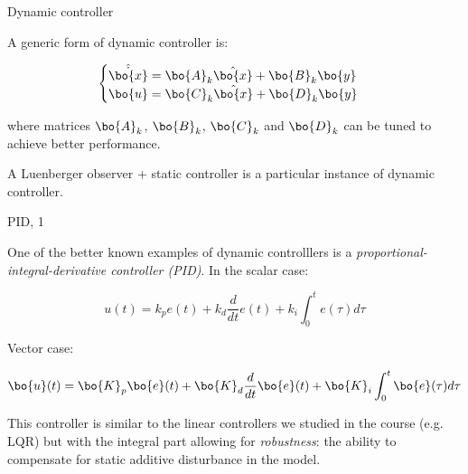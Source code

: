 \documentclass{beamer}
\begin{document}
\begin{frame}{Dynamic controller}
	\begin{flushleft}
		
		A generic form of dynamic controller is:
		
		\begin{equation}
			\begin{cases}
				\hat{\dot {\bo{x}}} = \bo{A}_k \hat{\bo{x}} + \bo{B}_k \bo{y}
				\\
				\bo{u} = \bo{C}_k \hat{\bo{x}} + \bo{D}_k \bo{y}
			\end{cases}
		\end{equation}
		
		where matrices $\bo{A}_k$, $\bo{B}_k$, $\bo{C}_k$ and $\bo{D}_k$ can be tuned to achieve better performance.
		
		\bigskip
		
		A Luenberger observer + static controller is a particular instance of dynamic controller.
		
	\end{flushleft}
\end{frame}



\begin{frame}{PID, 1}
	\begin{flushleft}
		
		One of the better known examples of dynamic controlllers is a \emph{proportional-integral-derivative controller (PID)}. In the scalar case:
		
		\begin{equation}
			u(t) = k_p e(t) + k_d \frac{d}{dt} e(t) + k_i \int_{0}^{t} e(\tau) d \tau
		\end{equation}
		
		Vector case:
		
		\begin{equation}
			\bo{u}(t) = \bo{K}_p \bo{e}(t) + \bo{K}_d \frac{d}{dt} \bo{e}(t) + \bo{K}_i \int_{0}^{t} \bo{e}(\tau) d \tau
		\end{equation}
		
%		
		
		This controller is similar to the linear controllers we studied in the course (e.g. LQR) but with the integral part allowing for \emph{robustness}: the ability to compensate for static additive disturbance in the model.
		
	\end{flushleft}
\end{frame}
\end{document}
